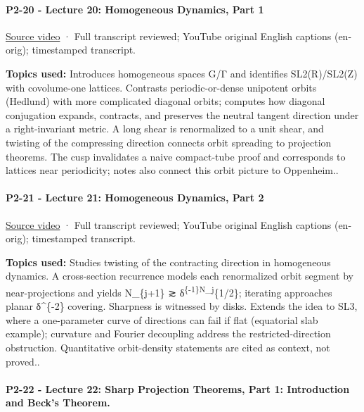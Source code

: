 \paragraph{P2-20 - Lecture 20: Homogeneous Dynamics, Part 1}\label{p2-20---lecture-20-homogeneous-dynamics-part-1}

\href{https://www.youtube.com/watch?v=rChKr66KG-c}{Source video} · Full transcript reviewed; YouTube original English captions (en-orig); timestamped transcript.

\textbf{Topics used:} Introduces homogeneous spaces G/Γ and identifies SL2(R)/SL2(Z) with covolume-one lattices. Contrasts periodic-or-dense unipotent orbits (Hedlund) with more complicated diagonal orbits; computes how diagonal conjugation expands, contracts, and preserves the neutral tangent direction under a right-invariant metric. A long shear is renormalized to a unit shear, and twisting of the compressing direction connects orbit spreading to projection theorems. The cusp invalidates a naive compact-tube proof and corresponds to lattices near periodicity; notes also connect this orbit picture to Oppenheim..

\paragraph{P2-21 - Lecture 21: Homogeneous Dynamics, Part 2}\label{p2-21---lecture-21-homogeneous-dynamics-part-2}

\href{https://www.youtube.com/watch?v=5QV8Gr1z16E}{Source video} · Full transcript reviewed; YouTube original English captions (en-orig); timestamped transcript.

\textbf{Topics used:} Studies twisting of the contracting direction in homogeneous dynamics. A cross-section recurrence models each renormalized orbit segment by near-projections and yields N\_\{j+1\} ≳ δ\textsuperscript{\{-1\}N\_j}\{1/2\}; iterating approaches planar δ\^{}\{-2\} covering. Sharpness is witnessed by disks. Extends the idea to SL3, where a one-parameter curve of directions can fail if flat (equatorial slab example); curvature and Fourier decoupling address the restricted-direction obstruction. Quantitative orbit-density statements are cited as context, not proved..

\paragraph{P2-22 - Lecture 22: Sharp Projection Theorems, Part 1: Introduction and Beck's Theorem.}\label{p2-22---lecture-22-sharp-projection-theorems-part-1-introduction-and-becks-theorem.}

